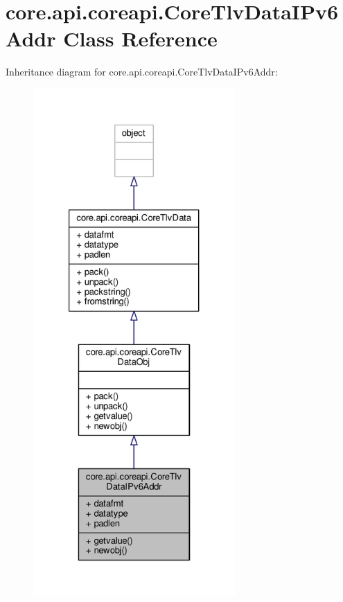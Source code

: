 \hypertarget{classcore_1_1api_1_1coreapi_1_1_core_tlv_data_i_pv6_addr}{\section{core.\+api.\+coreapi.\+Core\+Tlv\+Data\+I\+Pv6\+Addr Class Reference}
\label{classcore_1_1api_1_1coreapi_1_1_core_tlv_data_i_pv6_addr}
}


Inheritance diagram for core.\+api.\+coreapi.\+Core\+Tlv\+Data\+I\+Pv6\+Addr\+:
\nopagebreak
\begin{figure}[H]
\begin{center}
\leavevmode
\includegraphics[height=550pt]{classcore_1_1api_1_1coreapi_1_1_core_tlv_data_i_pv6_addr__inherit__graph}
\end{center}
\end{figure}


